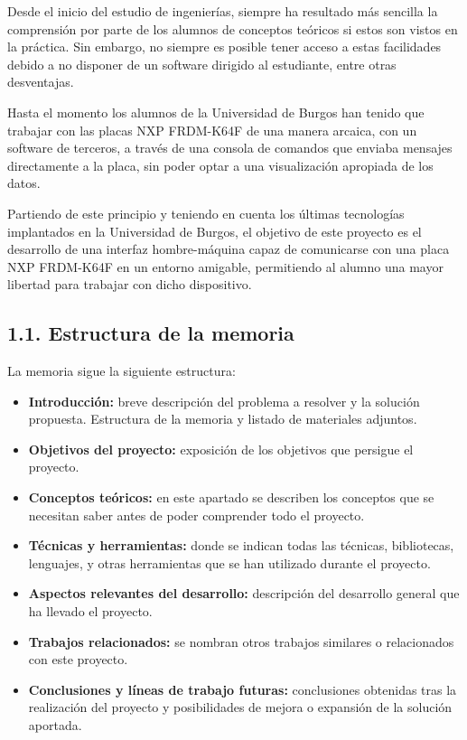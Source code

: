 
Desde el inicio del estudio de ingenierías, siempre ha resultado más sencilla la comprensión por parte de los alumnos de conceptos teóricos si estos son vistos en la práctica. Sin embargo, no siempre es posible tener acceso a estas facilidades debido a no disponer de un software dirigido al estudiante, entre otras desventajas.

Hasta el momento los alumnos de la Universidad de Burgos han tenido que trabajar con las placas NXP FRDM-K64F de una manera arcaica, con un software de terceros, a través de una consola de comandos que enviaba mensajes directamente a la placa, sin poder optar a una visualización apropiada de los datos.

Partiendo de este principio y teniendo en cuenta los últimas tecnologías implantados en la Universidad de Burgos, el objetivo de este proyecto es el desarrollo de una interfaz hombre-máquina capaz de comunicarse con una placa NXP FRDM-K64F en un entorno amigable, permitiendo al alumno una mayor libertad para trabajar con dicho dispositivo.

\subsection{1.1. Estructura de la memoria}

La memoria sigue la siguiente estructura:
\begin{itemize}
	\item \textbf{Introducción:} breve descripción del problema a resolver y la solución propuesta. Estructura de la memoria y listado de materiales adjuntos.
	\item \textbf{Objetivos del proyecto:} exposición de los objetivos que persigue el proyecto.
	\item \textbf{Conceptos teóricos:} en este apartado se describen los conceptos que se necesitan saber antes de poder comprender todo el proyecto.
	\item \textbf{Técnicas y herramientas:} donde se indican todas las técnicas, bibliotecas, lenguajes, y otras herramientas que se han utilizado durante el proyecto.
	\item \textbf{Aspectos relevantes del desarrollo:} descripción del desarrollo general que ha llevado el proyecto.
	\item \textbf{Trabajos relacionados:} se nombran otros trabajos similares o relacionados con este proyecto. 
	\item \textbf{Conclusiones y líneas de trabajo futuras:} conclusiones obtenidas tras la realización del proyecto y posibilidades de mejora o expansión de la solución aportada.
\end{itemize}


